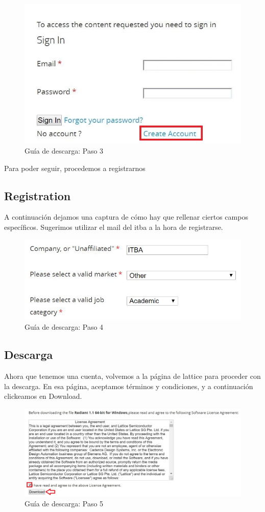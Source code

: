 \documentclass{article}
\begin{document}
\begin{figure}[H]
\centering
\includegraphics[width=0.4\linewidth]{Imagenes/3.JPG}
\caption{Guía de descarga: Paso 3}
\label{fig:step3}
\end{figure}

Para poder seguir, procedemos a registrarnos

\subsection{Registration}
A continuación dejamos una captura de cómo hay que rellenar ciertos campos específicos. Sugerimos utilizar el mail del itba a la hora de registrarse.

\begin{figure}[H]
\centering
\includegraphics[width=0.4\linewidth]{Imagenes/4.JPG}
\caption{Guía de descarga: Paso 4}
\label{fig:step4}
\end{figure}

\subsection{Descarga}
Ahora que tenemos una cuenta, volvemos a la página de lattice para proceder con la descarga. En esa página, aceptamos términos y condiciones, y a continuación clickeamos en Download.

\begin{figure}[H]
\centering
\includegraphics[width=1\linewidth]{Imagenes/5.JPG}
\caption{Guía de descarga: Paso 5}
\label{fig:step5}
\end{figure}
\end{document}
